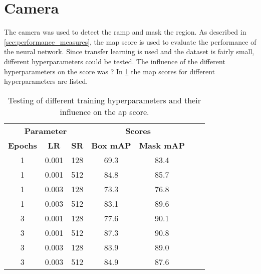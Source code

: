 \section{Camera}
The camera was used to detect the ramp and mask the region.
As described in \cref{sec:performance_measures}, the \gls{map} score is used to evaluate the performance of the neural network.
Since transfer learning is used and the dataset is fairly small, different hyperparameters could be tested.
The influence of the different hyperparameters on the score was ?
In \cref{tab:detection_eval} the \gls{map} scores for different hyperparameters are listed.
\begin{table}
	\centering
	\caption[Detection evaluation]{Testing of different training hyperparameters and their influence on the \acrshort{ap} score.}
	\label{tab:detection_eval}
	\begin{tabular}[htb]{ccccccc}
		\toprule
		\multicolumn{3}{c}{\textbf{Parameter} } & \multicolumn{2}{c}{\textbf{Scores} }                                                      \\
		\cmidrule(lr){1-3}                       \cmidrule(lr){4-5}
		\textbf{Epochs}                         & \textbf{LR}                          & \textbf{SR} & \textbf{Box mAP} & \textbf{Mask mAP} \\
		\midrule
		1                                       & 0.001                                & 128         & 69.3             & 83.4              \\
		1                                       & 0.001                                & 512         & 84.8             & 85.7              \\
		1                                       & 0.003                                & 128         & 73.3             & 76.8              \\
		1                                       & 0.003                                & 512         & 83.1             & 89.6              \\
		3                                       & 0.001                                & 128         & 77.6             & 90.1              \\
		3                                       & 0.001                                & 512         & 87.3             & 90.8              \\
		3                                       & 0.003                                & 128         & 83.9             & 89.0              \\
		3                                       & 0.003                                & 512         & 84.9             & 87.6              \\
		\bottomrule
	\end{tabular}
\end{table}
